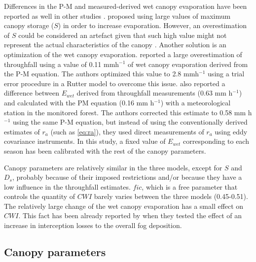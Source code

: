 \documentclass[a4paper,12pt]{article}
\begin{document}
Differences in the P-M and measured-derived wet canopy evaporation have been reported as well in other studies \citep{Scatena1990, Dykes1997, Waterlooetal1999, Schellekensetal1999, WallaceandMcJannet2008, Holwerdaetal2012}. \cite{Calderetal1986} proposed using large values of maximum canopy storage ($S$) in order to increase evaporation. However, an overestimation of $S$ could be considered an artefact given that such high value might not represent the actual characteristics of the canopy \citep{Lloydetal1988}. Another solution is an optimization of the wet canopy evaporation. \cite{Schellekensetal1999} reported a large overestimation of throughfall using a value of 0.11 mmh$^{-1}$ of wet canopy evaporation derived from the P-M equation. The authors optimized this value to 2.8 mmh$^{-1}$ using a trial error procedure in a Rutter model to overcome this issue. \cite{Holwerdaetal2012} also reported a difference between $E_{wet}$ derived from throughfall measurements (0.63 mm h$^{-1}$) and calculated with the PM equation (0.16 mm h$^{-1}$) with a meteorological station in the monitored forest. The authors corrected this estimate to 0.58 mm h$^{-1}$ using the same P-M equation, but instead of using the conventionally derived estimates of $r_a$ (such as \autoref{eq:ra}), they used direct measurements of $r_a$ using eddy covariance instruments. In this study, a fixed value of $E_{wet}$ corresponding to each season has been calibrated with the rest of the canopy parameters.

Canopy parameters are relatively similar in the three models, except for $S$ and $D_s$, probably because of their imposed restrictions and/or because they have a low influence in the throughfall estimates. $fic$, which is a free parameter that controls the quantity of $CWI$ barely varies between the three models (0.45-0.51). The relatively large change of the wet canopy evaporation has a small effect on $CWI$. This fact has been already reported by \cite{Holwerdaetal2006} when they tested the effect of an increase in interception losses to the overall fog deposition.

\subsection{Canopy parameters} \label{dis_int_model}
\end{document}
